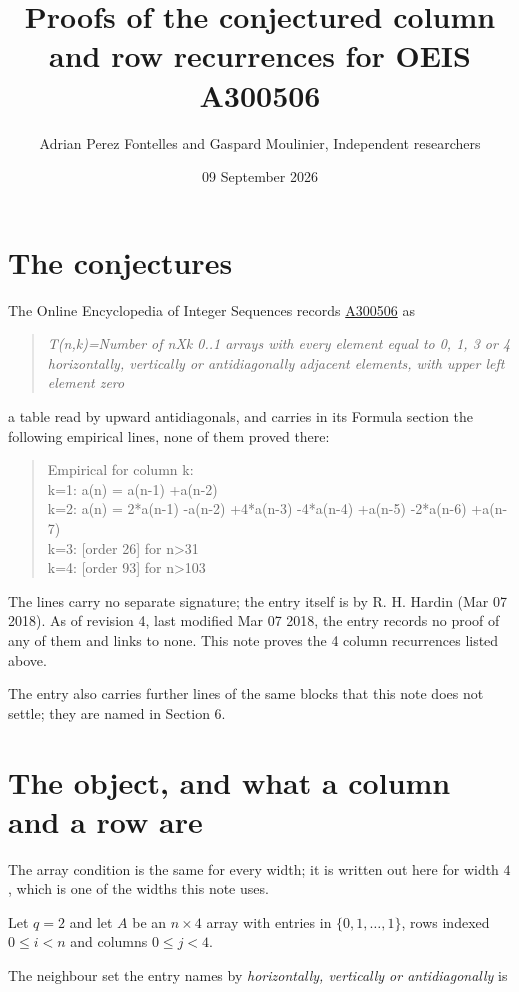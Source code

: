 \documentclass[11pt]{article}
\title{Proofs of the conjectured column and row recurrences for OEIS A300506}
\author{Adrian Perez Fontelles and Gaspard Moulinier, Independent researchers}
\date{09 September 2026}
\theoremstyle{definition}
\begin{document}
\maketitle
\section{The conjectures}

The Online Encyclopedia of Integer Sequences records \href{https://oeis.org/A300506}{A300506} as

\begin{quote}\itshape T(n,k)=Number of nXk 0..1 arrays with every element equal to 0, 1, 3 or 4 horizontally, vertically or antidiagonally adjacent elements, with upper left element zero\end{quote}

a table read by upward antidiagonals, and carries in its Formula section the following empirical lines, none of them proved there:

\begin{quote}\ttfamily Empirical for column k:\\
k=1: a(n) = a(n-1) +a(n-2)\\k=2: a(n) = 2*a(n-1) -a(n-2) +4*a(n-3) -4*a(n-4) +a(n-5) -2*a(n-6) +a(n-7)\\k=3: [order 26] for n>31\\k=4: [order 93] for n>103\end{quote}

The lines carry no separate signature; the entry itself is by R. H. Hardin (Mar 07 2018). As of revision 4, last modified Mar 07 2018, the entry records no proof of any of them and links to none. This note proves the 4 column recurrences listed above.

The entry also carries further lines of the same blocks that this note does not settle; they are named in Section 6.

\section{The object, and what a column and a row are}

The array condition is the same for every width; it is written out here for width $4$, which is one of the widths this note uses.

Let $q = 2$ and let $A$ be an $n \times 4$ array with entries in $\{0,1,\dots,1\}$, rows indexed $0 \le i < n$ and columns $0 \le j < 4$.

The neighbour set the entry names by {\itshape horizontally, vertically or antidiagonally} is
\end{document}
